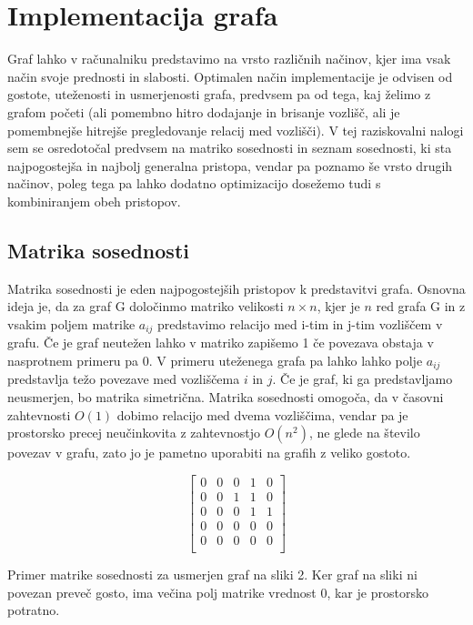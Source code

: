 \documentclass[11pt]{article}
\begin{document}
\section{Implementacija grafa}

Graf lahko v računalniku predstavimo na vrsto različnih načinov, kjer ima vsak način svoje prednosti in slabosti. Optimalen način implementacije je odvisen od gostote, uteženosti in usmerjenosti grafa, predvsem pa od tega, kaj želimo z grafom početi (ali pomembno hitro dodajanje in brisanje vozlišč, ali je pomembnejše hitrejše pregledovanje relacij med vozlišči). V tej raziskovalni nalogi sem se osredotočal predvsem na matriko sosednosti in seznam sosednosti, ki sta najpogostejša in najbolj generalna pristopa, vendar pa poznamo še vrsto drugih načinov, poleg tega pa lahko dodatno optimizacijo dosežemo tudi s kombiniranjem obeh pristopov.

\subsection{Matrika sosednosti}

Matrika sosednosti je eden najpogostejših pristopov k predstavitvi grafa. Osnovna ideja je, da za graf G določinmo matriko velikosti $n \times n$, kjer je $n$ red grafa G in z vsakim poljem matrike $a_{ij}$ predstavimo relacijo med i-tim in j-tim vozliščem v grafu. Če je graf neutežen lahko v matriko zapišemo 1 če povezava obstaja v nasprotnem primeru pa 0. V primeru uteženega grafa pa lahko lahko polje $a_{ij}$ predstavlja težo povezave med vozliščema $i$ in $j$. Če je graf, ki ga predstavljamo neusmerjen, bo matrika simetrična. Matrika sosednosti omogoča, da v časovni zahtevnosti $O(1)$ dobimo relacijo med dvema vozliščima, vendar pa je prostorsko precej neučinkovita z zahtevnostjo $O(n^{2})$, ne glede na število povezav v grafu, zato jo je pametno uporabiti na grafih z veliko gostoto.

\[
	\begin{bmatrix}
		0 & 0 & 0 & 1 & 0 \\
		0 & 0 & 1 & 1 & 0 \\
		0 & 0 & 0 & 1 & 1 \\
		0 & 0 & 0 & 0 & 0 \\
		0 & 0 & 0 & 0 & 0 \\
	\end{bmatrix}
\]

\thickspace

\noindent
Primer matrike sosednosti za usmerjen graf na sliki 2. Ker graf na sliki ni povezan preveč gosto, ima večina polj matrike vrednost 0, kar je prostorsko potratno.
\end{document}
